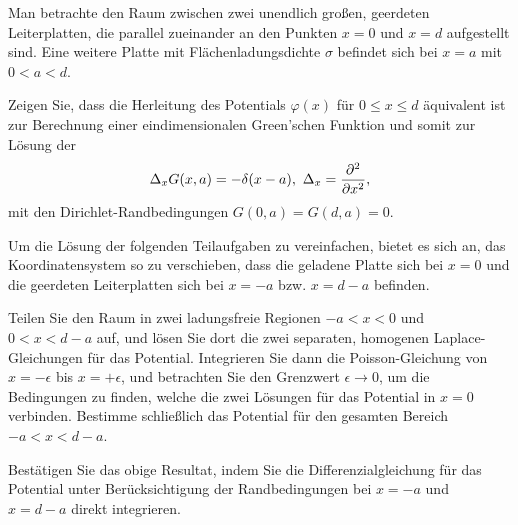 \begin{Problem}
Man betrachte den Raum zwischen zwei unendlich großen, geerdeten Leiterplatten, die parallel zueinander an den Punkten $x = 0$ und $x = d$ aufgestellt sind. Eine weitere Platte mit Flächenladungsdichte $\sigma$ befindet sich bei $x = a$ mit $0 < a < d$.
\begin{parts}
\item Zeigen Sie, dass die Herleitung des Potentials $\varphi(x)$ f\"{u}r $0\le x \le d$ \"{a}quivalent ist zur Berechnung einer eindimensionalen Green’schen Funktion und somit zur Lösung der
\[
\Delta_x G(x,a)=-\delta(x-a),~\Delta_x=\pdv[2]{x}
,\]
mit den Dirichlet-Randbedingungen $G(0,a)=G(d,a)=0$.

Um die Lösung der folgenden Teilaufgaben zu vereinfachen, bietet es sich an, das Koordinatensystem so zu verschieben, dass die geladene Platte sich bei $x = 0$ und die geerdeten Leiterplatten sich bei $x = -a$ bzw. $x = d - a$ befinden.
\item Teilen Sie den Raum in zwei ladungsfreie Regionen $-a < x < 0$ und $0 < x < d - a$ auf, und lösen Sie dort die zwei separaten, homogenen Laplace-Gleichungen für das Potential. Integrieren Sie dann die Poisson-Gleichung von $x = -\epsilon$ bis $x = +\epsilon$, und betrachten Sie den Grenzwert $\epsilon\to 0$, um die Bedingungen zu finden, welche die zwei Lösungen für das Potential in $x = 0$ verbinden. Bestimme schließlich das Potential für den gesamten Bereich $-a < x < d - a$.
\item Bestätigen Sie das obige Resultat, indem Sie die Differenzialgleichung für das Potential unter Berücksichtigung der Randbedingungen bei $x = -a$ und $x = d - a$ direkt integrieren. 
\end{parts}
\end{Problem}

